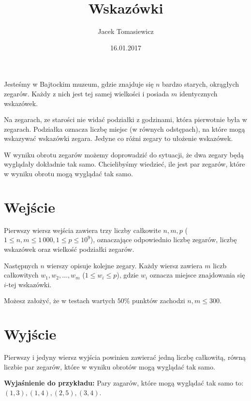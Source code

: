 \documentclass[zad,zawodnik]{sinol}
\title{Wskazówki}
\author{Jacek Tomasiewicz}
\date{16.01.2017}
\begin{document}
  \begin{tasktext}%
Jesteśmy w Bajtockim muzeum, gdzie znajduje się $n$ bardzo starych, okrągłych zegarów. Każdy z nich jest tej samej wielkości i posiada $m$ identycznych wskazówek. 

Na zegarach, ze starości nie widać podziałki z godzinami, która pierwotnie była w zegarach. Podziałka oznacza liczbę miejsc (w równych odstępach), na które mogą wskazywać wskazówki zegara. Jedyne co różni zegary to ułożenie wskazówek. 

W wyniku obrotu zegarów możemy doprowadzić do sytuacji, że dwa zegary będą wyglądały dokładnie tak samo. Chcielibyśmy wiedzieć, ile jest par zegarów, które w wyniku obrotu mogą wyglądać tak samo.
 
  \section{Wejście}
Pierwszy wiersz wejścia zawiera trzy liczby całkowite $n, m, p$ ($1 \leq n, m \leq 1\,000, 1 \leq p \leq 10^9$), oznaczające odpowiednio liczbę zegarów, liczbę wskazówek oraz wielkość podziałki zegarów. 

Następnych $n$ wierszy opisuje kolejne zegary. Każdy wiersz zawiera $m$ liczb całkowitych $w_1, w_2, \ldots, w_m$ ($1 \leq w_i \leq p$), gdzie $w_i$ oznacza miejsce znajdowania się $i$-tej wskazówki.

Możesz założyć, że w testach wartych $50\%$ punktów zachodzi $n, m \leq 300$.

  \section{Wyjście}
Pierwszy i jedyny wiersz wyjścia powinien zawierać jedną liczbę całkowitą, równą liczbie par zegarów, które w wyniku obrotów mogą wyglądać tak samo.

     \makestandardexample

\bigskip
\noindent
\textbf{Wyjaśnienie do przykładu:} 
Pary zagarów, które mogą wyglądać tak samo to: $(1,3), (1,4), (2,5), (3,4)$.

  \end{tasktext}
\end{document}
